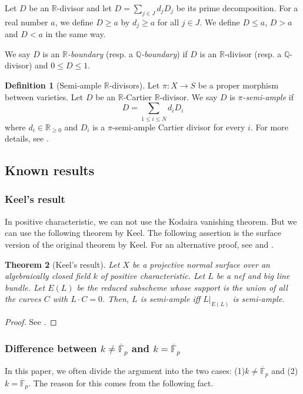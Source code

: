 \documentclass[12pt,twoside]{amsart}
\newtheorem{thm}{Theorem}[section]
\theoremstyle{definition}
\newtheorem{dfn}[thm]{Definition}
\newcommand{\Q}{$\mathbb{Q}$}
\newcommand{\R}{$\mathbb{R}$}
\newcommand{\fff}{\overline{\mathbb{F}}_p}
\begin{document}
Let $D$ be an \R-divisor and 
let $D=\sum_{j\in J} d_jD_j$ be its prime decomposition. 
For a real number $a$, we define 
$D\geq a$ by $d_j\geq a$ for all $j\in J$. 
We define $D\leq a$, $D> a$ and $D<a$ in the same way. 

We say $D$ is an {\em $\mathbb{R}$-boundary} 
(resp. a {\em \Q-boundary}) if 
$D$ is an $\mathbb{R}$-divisor (resp. a \Q-divisor) and 
$0\leq D\leq 1$. 

\begin{dfn}[Semi-ample \R-divisors]
Let $\pi:X\to S$ be a proper morphism between varieties. 
Let $D$ be an \R-Cartier \R-divisor. 
We say $D$ is {\em $\pi$-semi-ample} if 
$$D=\sum_{1\leq i\leq N} d_iD_i$$
where $d_i\in\mathbb R_{\geq 0}$ and 
$D_i$ is a $\pi$-semi-ample Cartier divisor for every $i$. 
For more details, see \cite[Section~4]{Fujino1}.
\end{dfn}


\subsection{Known results}

\subsubsection{Keel's result}

In positive characteristic, 
we can not use the Kodaira vanishing theorem. 
But we can use the following theorem by Keel. 
The following assertion is 
the surface version of the original theorem by Keel. 
For an alternative proof, see \cite{CMM} and \cite[Section~2]{FT}.  

\begin{thm}[Keel's result]\label{keel}
Let $X$ be a projective normal surface over 
an algebraically closed field $k$ of positive characteristic. 
Let $L$ be a nef and big line bundle. 
Let $E(L)$ be the reduced subscheme whose support is 
the union of all the curves $C$ with $L\cdot C=0$. 
Then, $L$ is semi-ample iff $L|_{E(L)}$ is semi-ample. 
\end{thm}

\begin{proof}
See \cite[Theorem 0.2]{Keel}.
\end{proof}



\subsubsection{Difference between $k\neq\overline{\mathbb{F}}_p$ and 
$k=\overline{\mathbb{F}}_p$}
In this paper, we often divide the argument 
into the two cases: (1)$k \neq \fff$ and (2)$k=\fff$. 
The reason for this comes from the following fact. 
\end{document}
